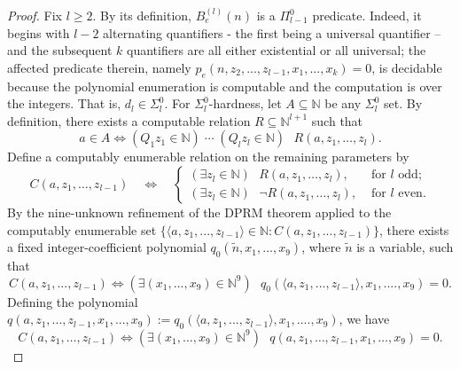 \documentclass[10pt, a4paper, reqno]{amsart}
\numberwithin{equation}{section}
\renewcommand{\geq}{\geqslant}
\theoremstyle{definition}
\theoremstyle{definition}
\begin{document}
\begin{proof}
Fix $l\geq2$. By its definition, $B^{(l)}_e(n)$ is a $\Pi^0_{l-1}$ predicate. Indeed, it begins with $l-2$ alternating quantifiers - the first being a universal quantifier -- and the subsequent $k$ quantifiers are all either existential or all universal; the affected predicate therein, namely $p_e(n, z_2, ..., z_{l-1} , x_1, ..., x_k) = 0$, is decidable because the polynomial enumeration is computable and the computation is over the integers. That is, $d_l \in\Sigma_{l}^{0}$.
For $\Sigma_{l}^{0}$-hardness, let $A\subseteq\mathbb N$ be any $\Sigma_{l}^{0}$ set. By definition, there exists a computable relation $R \subseteq \mathbb{N}^{l+1}$ such that
\begin{equation}\label{eq:presupposition-level-normal-form}
 a \in A \iff   (Q_1z_1 \in \mathbb{N})\;\cdots\;(Q_lz_l \in \mathbb{N})\textrm{ }R(a,z_1,\ldots,z_l).
\end{equation}
Define a computably enumerable relation on the remaining parameters by
\[
    C(a,z_1,\ldots,z_{l-1})\quad\Longleftrightarrow\quad
    \begin{cases}
        (\exists z_l \in \mathbb{N})\textrm{ }R(a,z_1,\ldots,z_l), & \text{ for } l\text{ odd};\\
        (\exists z_l \in \mathbb{N})\textrm{ }\neg R(a,z_1,\ldots,z_l),  &\textrm{ for } l\text{ even}.
    \end{cases}
\]
By the nine-unknown refinement of the DPRM theorem \cite{Matiyasevich1993,Jones1982} applied to the computably enumerable set $\{ \langle a, z_1, ..., z_{l-1} \rangle \in \mathbb{N} : C(a, z_1, ..., z_{l-1})\}$, there exists a fixed integer-coefficient polynomial $q_0(\tilde{n}, x_1, ..., x_9)$, where $\tilde{n}$ is a variable, such that
\begin{equation*}
C(a, z_1, ..., z_{l-1}) \iff (\exists (x_1, ..., x_9) \in \mathbb{N}^9) \textrm{ }q_0(\langle a, z_1, ..., z_{l-1} \rangle, x_1, ...., x_9) = 0.
\end{equation*}
Defining the polynomial $q(a, z_1, ..., z_{l-1}, x_1, ..., x_9) := q_0(\langle a, z_1, ..., z_{l-1} \rangle, x_1, ...., x_9)$, we have
\[
    C(a,z_1,\ldots,z_{l-1})\iff
    (\exists(x_1,\ldots,x_9)\in\mathbb N^9)\textrm{ }
    q(a,z_1,\ldots,z_{l-1},x_1,\ldots,x_9)=0.
\]

\end{proof}
\end{document}
